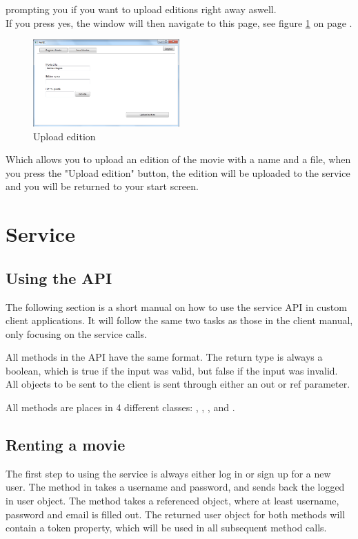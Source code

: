  prompting you if you want to upload editions right away aswell.
\\If you press yes, the window will then navigate to this page, see figure \ref{fig:Manual_Client_Navigation_Upload_Edition} on page \pageref{fig:Manual_Client_Navigation_Upload_Edition}.


\begin{figure}[h!]  
  \centering
\includegraphics[width=0.5\textwidth]{Parts/Images/Manual/CPUploadEdition}
\caption{Upload edition}
\label{fig:Manual_Client_Navigation_Upload_Edition}
\end{figure}
 
Which allows you to upload an edition of the movie with a name and a file, when you press the "Upload edition" button, the edition will be uploaded to the service and you will be returned to your start screen.

\section{Service}
\label{Manual_Service}

\subsection{Using the API}
\label{Manual_Service_Usage}
The following section is a short manual on how to use the service API in custom client applications. It will follow the same two tasks as those in the client manual, only focusing on the service calls.

All methods in the API have the same format. The return type is always a boolean, which is true if the input was valid, but false if the input was invalid. All objects to be sent to the client is sent through either an out or ref parameter.

All methods are places in 4 different classes: , , , and .

\subsection{Renting a movie}
\label{Manual_Service_Usage_Rent}
The first step to using the service is always either log in or sign up for a new user. The  method in  takes a username and password, and sends back the logged in user object. The  method takes a referenced  object, where at least username, password and email is filled out. The returned user object for both methods will contain a token property, which will be used in all subsequent method calls.

